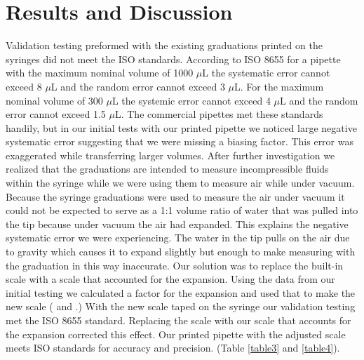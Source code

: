 \documentclass[10pt,letterpaper]{article}
\begin{document}
\section*{Results and Discussion}
Validation testing preformed with the existing graduations printed on the syringes did not meet the ISO standards.
According to ISO 8655 for a pipette with the maximum nominal volume of 1000 $\mu$L the systematic error cannot exceed 8 $\mu$L and the random error cannot exceed 3 $\mu$L.
For the maximum nominal volume of 300 $\mu$L the systemic error cannot exceed 4 $\mu$L and the random error cannot exceed 1.5 $\mu$L.
The commercial pipettes met these standards handily, but in our initial tests with our printed pipette we noticed large negative systematic error suggesting that we were missing a biasing factor. 
This error was exaggerated while transferring larger volumes.
After further investigation we realized that the graduations are intended to measure incompressible fluids within the syringe while we were using them to measure air while under vacuum.
Because the syringe graduations were used to measure the air under vacuum it could not be expected to serve as a 1:1 volume ratio of water that was pulled into the tip because under vacuum the air had expanded.
This explains the negative systematic error we were experiencing.
The water in the tip pulls on the air due to gravity which causes it to expand slightly but enough to make measuring with the graduation in this way inaccurate.
Our solution was to replace the built-in scale with a scale that accounted for the expansion.
Using the data from our initial testing we calculated a factor for the expansion and used that to make the new scale ( and .)
With the new scale taped on the syringe our validation testing met the ISO 8655 standard.
Replacing the scale with our scale that accounts for the expansion corrected this effect. 
Our printed pipette with the adjusted scale meets ISO standards for accuracy and precision. (Table \ref{table3} and \ref{table4}).
\end{document}
